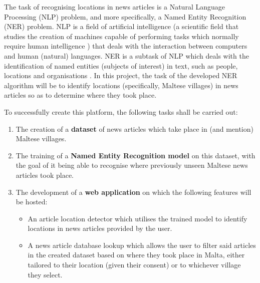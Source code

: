 \documentclass[a4paper, oneside, 11pt]{article}
\begin{document}
\begin{multicols*}{2}
  The task of recognising locations in news articles is a Natural Language Processing (NLP) problem, and more specifically, a Named Entity Recognition (NER) problem. NLP is a field of artificial intelligence (a scientific field that studies the creation of machines capable of performing tasks which normally require human intelligence \cite{poole2010artificial}) that deals with the interaction between computers and human (natural) languages. NER is a subtask of NLP which deals with the identification of named entities (subjects of interest) in text, such as people, locations and organisations \cite{nadeau2007survey}. In this project, the task of the developed NER algorithm will be to identify locations (specifically, Maltese villages) in news articles so as to determine where they took place.

  To successfully create this platform, the following tasks shall be carried out:
  \begin{enumerate}
    \item The creation of a \textbf{dataset} of news articles which take place in (and mention) Maltese villages.
    \item The training of a \textbf{Named Entity Recognition model} on this dataset, with the goal of it being able to recognise where previously unseen Maltese news articles took place.
    \item The development of a \textbf{web application} on which the following features will be hosted:
          \begin{itemize}
            \item An article location detector which utilises the trained model to identify locations in news articles provided by the user.
            \item A news article database lookup which allows the user to filter said articles in the created dataset based on where they took place in Malta, either tailored to their location (given their consent) or to whichever village they select.
          \end{itemize}
  \end{enumerate}



\end{multicols*}
\end{document}
